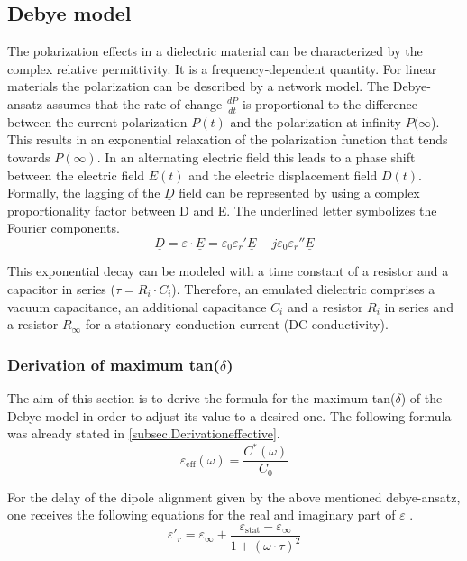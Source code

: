 \subsection{Debye model}
The polarization effects in a dielectric material can be characterized by the complex relative permittivity. It is a frequency-dependent quantity. 
For linear materials the polarization can be described by a network model. The Debye-ansatz assumes that the rate of change $ \frac{dP}{dt}$ is proportional to the difference between the current polarization $P(t)$  and the polarization at infinity $P(\infty$). This results in an exponential relaxation of the polarization function that tends towards $P(\infty)$. In an alternating electric field this leads to a phase shift between the electric field $E(t)$  and the  
electric displacement field $D(t)$.\newline
Formally, the lagging of the $\underline{D}$ field can be represented by using a complex proportionality factor between D and E. The underlined letter symbolizes the Fourier components.
\begin{equation}
 \underline{D}=\varepsilon \cdot \underline{E} = \varepsilon_{0}\varepsilon_{r}'\underline{E}-j\varepsilon_{0}\varepsilon_{r}''\underline{E}
\end{equation}


This exponential decay can be modeled with a  time constant of a resistor and a capacitor in series ($\tau=R_i \cdot C_i$). Therefore, an emulated dielectric comprises a vacuum capacitance, an additional capacitance $C_i$ and a resistor $R_i$ in series and a resistor $R_{\infty}$ for a stationary conduction current (DC conductivity). 


\subsubsection{Derivation of maximum tan($\delta$)}
The aim of this section is to derive the formula for the maximum tan($\delta$) of the Debye model in order to adjust its value to a desired one. The following formula was already stated in \ref{subsec.Derivationeffective}.
\begin{equation}
\varepsilon_{\textrm{eff}} (\omega) = \frac{C^*(\omega)}{C_0}
\end{equation}




For the delay of the dipole alignment given by the above  mentioned debye-ansatz, one receives the following equations for the real and imaginary part of $\varepsilon$ \cite{Kuchler}. 
\begin{equation}
\varepsilon'_r = \varepsilon_{\infty} + \frac{\varepsilon_{\textrm{stat}}-\varepsilon_{\infty}}{1+(\omega \cdot \tau )^2}
\end{equation}


